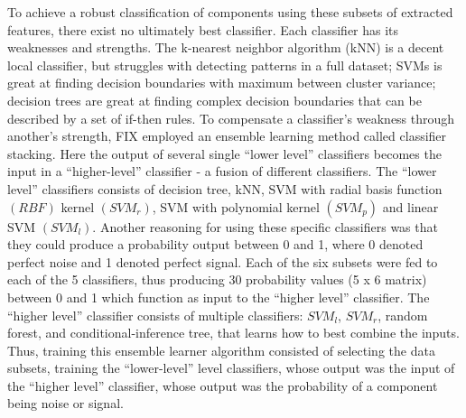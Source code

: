 To achieve a robust classification of components using these subsets of extracted features, there exist no ultimately best classifier. Each classifier has its weaknesses and strengths. The k-nearest neighbor algorithm (kNN) is a decent local classifier, but struggles with detecting patterns in a full dataset; SVMs is great at finding decision boundaries with maximum between cluster variance; decision trees are great at finding complex decision boundaries that can be described by a set of if-then rules. To compensate a classifier’s weakness through another’s strength, FIX employed an ensemble learning method called classifier stacking. Here the output of several single “lower level” classifiers becomes the input in a “higher-level” classifier - a fusion of different classifiers. The “lower level” classifiers consists of decision tree, kNN, SVM with radial basis function $(RBF)$ kernel $(SVM_r)$, SVM with polynomial kernel $(SVM_p)$ and linear SVM $(SVM_l)$. Another reasoning for using these specific classifiers was that they could produce a probability output between 0 and 1, where 0 denoted perfect noise and 1 denoted perfect signal. Each of the six subsets were fed to each of the 5 classifiers, thus producing 30 probability values (5 x 6 matrix) between 0 and 1 which function as input to the “higher level” classifier. The “higher level” classifier consists of multiple classifiers: $SVM_l$, $SVM_r$, random forest, and conditional-inference tree, that learns how to best combine the inputs. \\
Thus, training this ensemble learner algorithm consisted of selecting the data subsets, training the “lower-level” level classifiers, whose output was the input of the “higher level” classifier, whose output was the probability of a component being noise or signal.
